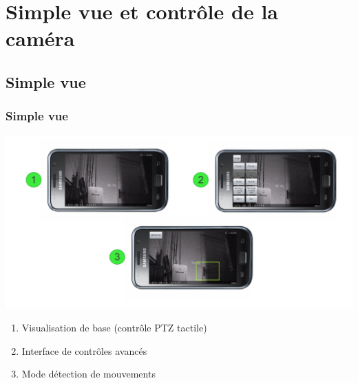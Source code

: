\section{Simple vue et contrôle de la caméra}
\subsection{Simple vue}
  \begin{frame}
   \frametitle{Simple vue}

  \centering
     \includegraphics[scale=0.5]{Images/ImageSlide6.pdf}

	\begin{minipage}{0.65\textwidth}
     \begin{enumerate}
    \item Visualisation de base (contrôle PTZ tactile)
    \item Interface de contrôles avancés
    \item Mode détection de mouvements
   \end{enumerate}
   \end{minipage}

  \end{frame}
